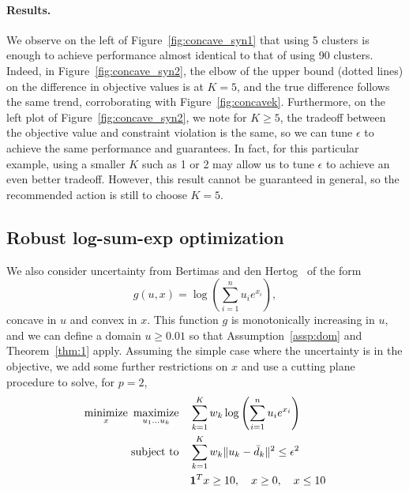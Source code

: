 \documentclass[12pt]{article}
\theoremstyle{thmstyleone}%
\theoremstyle{thmstyletwo}%
\theoremstyle{thmstylethree}%
\newcommand{\reviewChanges}{}
\begin{document}
\paragraph{Results.}  We observe on the left of Figure~\ref{fig:concave_syn1} that using 5 clusters is enough to achieve performance almost identical to that of using 90 clusters.
\reviewChanges{
Indeed, in Figure~\ref{fig:concave_syn2}, the elbow of the upper bound (dotted lines) on the difference in objective values is at $K = 5$, and the true difference follows the same trend, corroborating with Figure~\ref{fig:concavek}.}
Furthermore, on the left plot of Figure~\ref{fig:concave_syn2}, we note for $K \geq 5$, the tradeoff between the objective value and constraint violation is the same, so we can tune $\epsilon$ to achieve the same performance and guarantees.
In fact, for this particular example, using a smaller $K$ such as 1 or 2 may allow us to tune $\epsilon$ to achieve an even better tradeoff. However, this result cannot be guaranteed in general, so the recommended action is still to choose $K=5$.


\subsection{Robust log-sum-exp optimization}
\label{sub:logsumexp}
We also consider uncertainty from Bertimas and den Hertog~\cite[Chapter 14]{robustadaptopt} of the form
\begin{equation*}
	g(u,x) = \log\left(\sum_{i = 1}^n u_i e^{x_i}\right),
\end{equation*}
concave in $u$ and convex in $x$. This function $g$ is monotonically increasing in $u$, and we can define a domain $u \geq 0.01$ so that Assumption~\ref{assp:dom} and Theorem~\ref{thm:1} apply.
Assuming the simple case where the uncertainty is in the objective, we add some further restrictions on $x$ and use a cutting plane procedure to solve, for $p = 2$,
\begin{equation*}
	\begin{aligned}
	\underset{x}{\text{minimize}} \hspace{0.5em} \underset{u_1\dots u_k}{\text{maximize}} &\quad \sum_{k=1} ^K w_k  \log\left(\sum_{i = 1}^n u_i e^{x_i}\right) \\
	\mbox{subject to} & \quad \sum_{k=1} ^K w_k \| u_k - \bar{d}_k \|^2 \le \epsilon^2\\
	&\quad   \mathbf 1^T x \geq 10, \quad x \geq 0, \quad x \leq 10
	\end{aligned}
\end{equation*}
\end{document}
